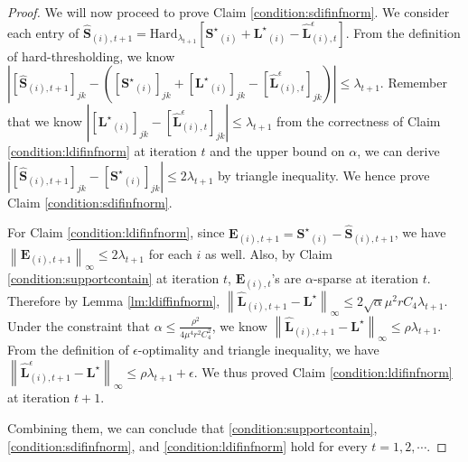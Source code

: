 \documentclass[twoside,11pt]{article}
\newcommand{\abs}[1]{\left\vert #1\right\vert}
\newcommand{\norm}[1]{\left\lVert#1\right\rVert}
\newcommand{\hard}[2]{\text{Hard}_{#1}\left[#2\right]}
\newcommand{\matE}{\mathbf{E}}
\newcommand{\matLst}{{\mathbf{L}^\star}}
\newcommand{\matSst}{{\mathbf{S}^\star}}
\newcommand{\hmatL}{\hat{\mathbf{L}}}
\newcommand{\hmatLeps}{\hat{\mathbf{L}}^{\epsilon}}
\newcommand{\hmatS}{\hat{\mathbf{S}}}
\newcommand{\gop}{\sigma_{\max}}
\newcommand{\bn}{{\overline{n}}}
\begin{document}
\begin{proof}
We will now proceed to prove Claim \ref{condition:sdifinfnorm}. We consider each entry of $\hmatS_{(i),t+1}=\hard{\lambda_{t+1}}{\matSst_{(i)}+\matLst_{(i)}-\hmatLeps_{(i),t}}$. From the definition of hard-thresholding, we know $\abs{[\hmatS_{(i),t+1}]_{jk}-\left([\matSst_{(i)}]_{jk}+[\matLst_{(i)}]_{jk}-[\hmatLeps_{(i),t}]_{jk}\right)}\le \lambda_{t+1}$. Remember that we know $\abs{[\matLst_{(i)}]_{jk}-[\hmatLeps_{(i),t}]_{jk}}\le \lambda_{t+1}$ from the correctness of Claim \ref{condition:ldifinfnorm} at iteration $t$ and the upper bound on $\alpha$, we can derive $\abs{[\hmatS_{(i),t+1}]_{jk}-[\matSst_{(i)}]_{jk}}\le 2\lambda_{t+1}$ by triangle inequality. %
We hence prove Claim \ref{condition:sdifinfnorm}.

For Claim \ref{condition:ldifinfnorm}, since $\matE_{(i),t+1}=\matSst_{(i)}-\hmatS_{(i),t+1}$, we have $\norm{\matE_{(i),t+1}}_{\infty}\le 2\lambda_{t+1}$ for each $i$ as well. Also, by Claim \ref{condition:supportcontain} at iteration $t$, $\matE_{(i),t}$'s are $\alpha$-sparse at iteration $t$. Therefore by Lemma \ref{lm:ldiffinfnorm}, $\norm{\hmatL_{(i),t+1}-\matLst}_{\infty}\le 2\sqrt{\alpha}\mu^2 r C_4 \lambda_{t+1}$. Under the constraint that $\alpha\le \frac{\rho^2}{4\mu^4r^2C_4^2}$, we know $\norm{\hmatL_{(i),t+1}-\matLst}_{\infty}\le\rho\lambda_{t+1}$. From the definition of $\epsilon$-optimality and triangle inequality, we have $\norm{\hmatLeps_{(i),t+1}-\matLst}_{\infty}\le\rho\lambda_{t+1}+\epsilon$. We thus proved Claim \ref{condition:ldifinfnorm} at iteration $t+1$.

Combining them, we can conclude that \ref{condition:supportcontain}, \ref{condition:sdifinfnorm}, and \ref{condition:ldifinfnorm} hold for every $t=1,2,\cdots$. 


\end{proof}
\end{document}
